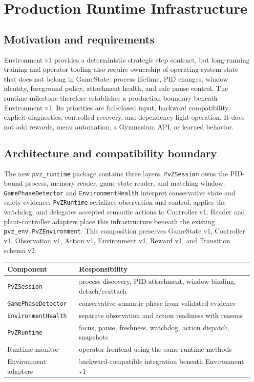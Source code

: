 \documentclass[11pt,a4paper]{article}
\begin{document}
\section{Production Runtime Infrastructure}
\subsection{Motivation and requirements}
Environment v1 provides a deterministic strategic step contract, but long-running training and operator tooling also require ownership of operating-system state that does not belong in GameState: process lifetime, PID changes, window identity, foreground policy, attachment health, and safe pause control. The runtime milestone therefore establishes a production boundary beneath Environment v1. Its priorities are fail-closed input, backward compatibility, explicit diagnostics, controlled recovery, and dependency-light operation. It does not add rewards, menu automation, a Gymnasium API, or learned behavior.

\subsection{Architecture and compatibility boundary}
The new \texttt{pvz\_runtime} package contains three layers. \texttt{PvZSession} owns the PID-bound process, memory reader, game-state reader, and matching window. \texttt{GamePhaseDetector} and \texttt{EnvironmentHealth} interpret conservative state and safety evidence. \texttt{PvZRuntime} serializes observation and control, applies the watchdog, and delegates accepted semantic actions to Controller v1. Reader and plant-controller adapters place this infrastructure beneath the existing \texttt{pvz\_env.PvZEnvironment}. This composition preserves GameState v1, Controller v1, Observation v1, Action v1, Environment v1, Reward v1, and Transition schema v2.

\begin{center}
\begin{tabular}{ll}
\toprule
Component & Responsibility \\
\midrule
\texttt{PvZSession} & process discovery, PID attachment, window binding, detach/reattach \\
\texttt{GamePhaseDetector} & conservative semantic phase from validated evidence \\
\texttt{EnvironmentHealth} & separate observation and action readiness with reasons \\
\texttt{PvZRuntime} & focus, pause, freshness, watchdog, action dispatch, snapshots \\
Runtime monitor & operator frontend using the same runtime methods \\
Environment adapters & backward-compatible integration beneath Environment v1 \\
\bottomrule
\end{tabular}
\end{center}
\end{document}
